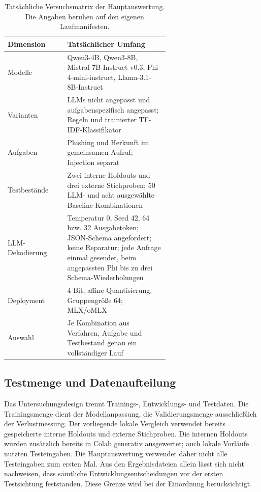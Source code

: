 \documentclass[12pt,twoside=false,a4paper,parskip]{scrbook}
\begin{document}
\begin{table}[H]
  \centering
  \begin{tabular}{lp{0.63\linewidth}}
    \toprule
    Dimension & Tatsächlicher Umfang \\
    \midrule
    Modelle & Qwen3-4B, Qwen3-8B, Mistral-7B-Instruct-v0.3, Phi-4-mini-instruct, Llama-3.1-8B-Instruct \\
    Varianten & LLMs nicht angepasst und aufgabenspezifisch angepasst; Regeln und trainierter TF-IDF-Klassifikator \\
    Aufgaben & Phishing und Herkunft im gemeinsamen Aufruf; Injection separat \\
    Testbestände & Zwei interne Holdouts und drei externe Stichproben; 50 LLM- und acht ausgewählte Baseline-Kombinationen \\
    LLM-Dekodierung & Temperatur 0, Seed 42, 64 bzw. 32 Ausgabetoken; JSON-Schema angefordert; keine Reparatur; jede Anfrage einmal gesendet, beim angepassten Phi bis zu drei Schema-Wiederholungen \\
    Deployment & 4 Bit, affine Quantisierung, Gruppengröße 64; MLX/oMLX \\
    Auswahl & Je Kombination aus Verfahren, Aufgabe und Testbestand genau ein vollständiger Lauf \\
    \bottomrule
  \end{tabular}
  \caption{Tatsächliche Versuchsmatrix der Hauptauswertung. Die Angaben beruhen auf den eigenen Laufmanifesten.}
  \label{tab:versuchsmatrix}
\end{table}


\subsection{Testmenge und Datenaufteilung}

Das Untersuchungsdesign trennt Trainings-, Entwicklungs- und Testdaten. Die Trainingsmenge dient der Modellanpassung, die Validierungsmenge ausschließlich der Verlustmessung. Der vorliegende lokale Vergleich verwendet bereits gespeicherte interne Holdouts und externe Stichproben. Die internen Holdouts wurden zusätzlich bereits in Colab generativ ausgewertet; auch lokale Vorläufe nutzten Testeingaben. Die Hauptauswertung verwendet daher nicht alle Testeingaben zum ersten Mal. Aus den Ergebnisdateien allein lässt sich nicht nachweisen, dass sämtliche Entwicklungsentscheidungen vor der ersten Testsichtung feststanden. Diese Grenze wird bei der Einordnung berücksichtigt.
\end{document}
